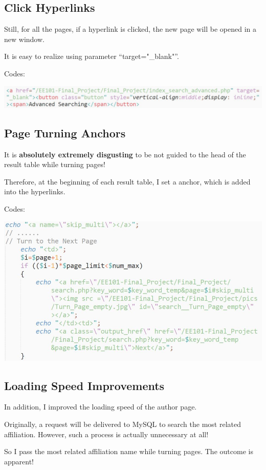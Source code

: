 \documentclass[10pt,twoside,a4paper,titlepage]{article}
\begin{document}
	\subsection{Click Hyperlinks}
		Still, for all the pages, if a hyperlink is clicked, the new page will be opened in a new window.\par
		It is easy to realize using parameter “target="\_blank"”.\newline\par
		Codes:\newline\par
		\includegraphics[width=1\textwidth]{gzl/08.jpg}
	\subsection{Page Turning Anchors}
		It is \textbf{absolutely extremely disgusting} to be not guided to the head of the result table while turning pages!\par
		Therefore, at the beginning of each result table, I set a anchor, which is added into the hyperlinks.\newline\par
		Codes:\newline\par
		\includegraphics[width=1\textwidth]{gzl/09.jpg}
	\subsection{Loading Speed Improvements}
		In addition, I improved the loading speed of the author page.\par
		Originally, a request will be delivered to MySQL to search the most related affiliation. However, such a process is actually unnecessary at all!\par
		So I pass the most related affiliation name while turning pages. The outcome is apparent!
\end{document}
